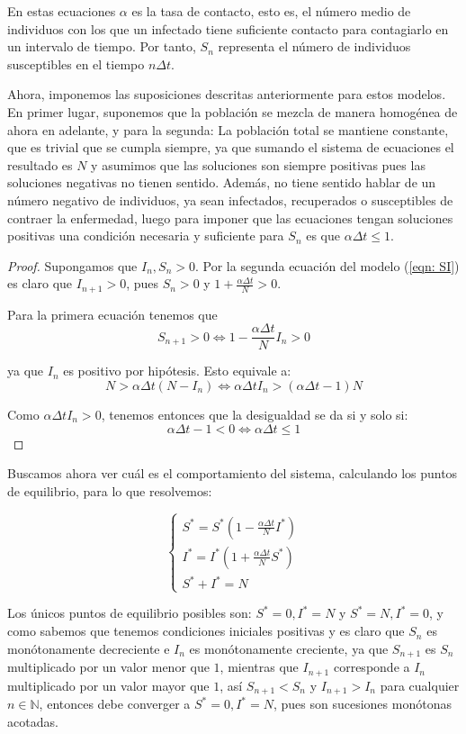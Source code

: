 En estas ecuaciones $\alpha$ es la tasa de contacto, esto es, el número medio de individuos con los que un infectado tiene suficiente contacto para contagiarlo en un intervalo de tiempo. Por tanto, $S_n$ representa el número de individuos susceptibles en el tiempo $n\Delta t$.

Ahora, imponemos las suposiciones descritas anteriormente para estos modelos. En primer lugar, suponemos que la población se mezcla de manera homogénea de ahora en adelante, y para la segunda: La población total se mantiene constante, que es trivial que se cumpla siempre, ya que sumando el sistema de ecuaciones el resultado es $N$ y asumimos que las soluciones son siempre positivas pues las soluciones negativas no tienen sentido.
Además, no tiene sentido hablar de un número negativo de individuos, ya sean infectados, recuperados o susceptibles de contraer la enfermedad, luego para imponer que las ecuaciones tengan soluciones positivas una condición necesaria y suficiente para $S_n$ es que $\alpha\Delta t \leq 1$.

\begin{proof}
Supongamos que $I_n, S_n > 0$. Por la segunda ecuación del modelo (\ref{eqn: SI}) es claro que $I_{n+1}>0$, pues $S_n>0$ y $1+\frac{\alpha\Delta t}{N}>0$.

Para la primera ecuación tenemos que 
$$S_{n+1}>0 \Leftrightarrow 1-\frac{\alpha\Delta t}{N}I_n >0$$

ya que $I_n$ es positivo por hipótesis. Esto equivale a:
$$N>\alpha\Delta t(N-I_n) \Leftrightarrow \alpha\Delta t I_n > (\alpha\Delta t -1) N$$

Como $\alpha\Delta t I_n > 0$, tenemos entonces que la desigualdad se da si y solo si:
$$\alpha\Delta t -1 <0 \Leftrightarrow \alpha\Delta t \leq 1$$
\end{proof}


Buscamos ahora ver cuál es el comportamiento del sistema, calculando los puntos de equilibrio, para lo que resolvemos:

$$
\begin{cases}
S^*=S^*\left( 1-\frac{\alpha\Delta t}{N}I^*\right) \\
I^*=I^*\left( 1+\frac{\alpha\Delta t}{N}S^*\right) \\
S^*+I^*=N
\end{cases}
$$

Los únicos puntos de equilibrio posibles son: $S^*=0, I^*=N$ y $S^*=N, I^*=0$, y como sabemos que tenemos condiciones iniciales positivas y es claro que $S_n$ es monótonamente decreciente e $I_n$ es monótonamente creciente, ya que $S_{n+1}$ es $S_n$ multiplicado por un valor menor que $1$, mientras que $I_{n+1}$ corresponde a $I_n$ multiplicado por un valor mayor que $1$, así $S_{n+1}<S_n$ y $I_{n+1}>I_n$ para cualquier $n\in\mathbb{N}$, entonces debe converger a $S^*=0, I^*=N$, pues son sucesiones monótonas acotadas.

